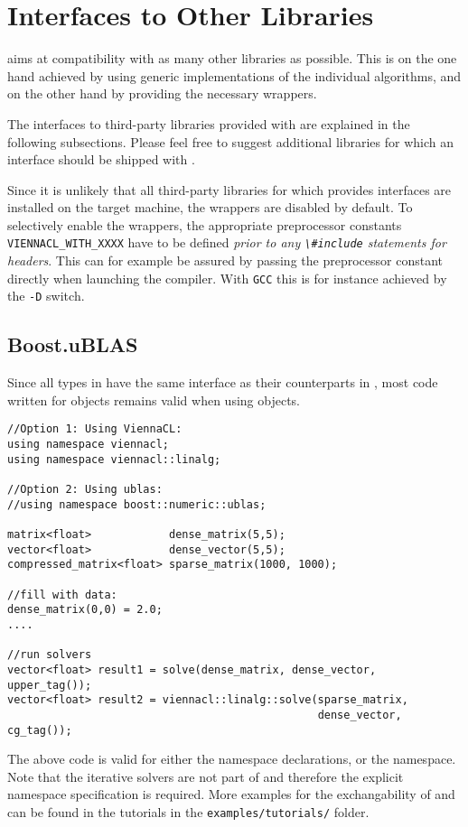 \chapter{Interfaces to Other Libraries} \label{chap:other-libs}
{\ViennaCL} aims at compatibility with as many other libraries as possible.
This is on the one hand achieved by using generic implementations of the individual algorithms,
and on the other hand by providing the necessary wrappers.

The interfaces to third-party libraries provided with {\ViennaCL} are explained in the following subsections.
Please feel free to suggest additional libraries for which an interface should be shipped with {\ViennaCL}.

Since it is unlikely that all third-party libraries for which {\ViennaCL} provides interfaces are installed
on the target machine, the wrappers are disabled by default. To selectively enable the wrappers,
the appropriate preprocessor constants \lstinline|VIENNACL_WITH_XXXX| have to be defined \emph{prior to any 
\lstinline|\#include| statements for {\ViennaCL} headers}. This can for example be assured by passing the
preprocessor constant directly when launching the compiler. With \lstinline|GCC| this is for instance 
achieved by the \lstinline|-D| switch.

\section{Boost.uBLAS}
Since all types in {\ViennaCL} have the same interface as their counterparts in {\ublas},
most code written for {\ViennaCL} objects remains valid when using {\ublas} objects.
\begin{lstlisting}
//Option 1: Using ViennaCL:
using namespace viennacl;
using namespace viennacl::linalg;

//Option 2: Using ublas:
//using namespace boost::numeric::ublas;

matrix<float>            dense_matrix(5,5);
vector<float>            dense_vector(5,5);
compressed_matrix<float> sparse_matrix(1000, 1000);

//fill with data:
dense_matrix(0,0) = 2.0;
....

//run solvers
vector<float> result1 = solve(dense_matrix, dense_vector, upper_tag());
vector<float> result2 = viennacl::linalg::solve(sparse_matrix,
                                                dense_vector, cg_tag());
\end{lstlisting}
The above code is valid for either the {\ViennaCL} namespace declarations, or the {\ublas} namespace. Note that the
iterative solvers are not part of {\ublas} and therefore the explicit namespace specification is required. More examples
for the exchangability of {\ublas} and {\ViennaCL} can be found in the tutorials in the \texttt{examples/tutorials/} folder.

